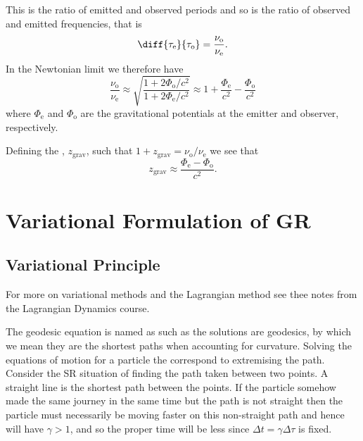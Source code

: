 \documentclass[fleqn]{NotesClass}
\begin{document}
    This is the ratio of emitted and observed periods and so is the ratio of observed and emitted frequencies, that is
    \begin{equation}
        \diff{\tau_{\mathrm{e}}}{\tau_{\mathrm{o}}} = \frac{\nu_{\mathrm{o}}}{\nu_{\mathrm{e}}}.
    \end{equation}
    In the Newtonian limit we therefore have
    \begin{equation}
        \frac{\nu_{\mathrm{o}}}{\nu_{\mathrm{e}}} \approx \sqrt{\frac{1 + 2\Phi_{\mathrm{o}}/c^2}{1 + 2\Phi_{\mathrm{e}}/c^2}} \approx 1 + \frac{\Phi_{\mathrm{e}}}{c^2} - \frac{\Phi_{\mathrm{o}}}{c^2}
    \end{equation}
    where \(\Phi_{\mathrm{e}}\) and \(\Phi_{\mathrm{o}}\) are the gravitational potentials at the emitter and observer, respectively.
    
    Defining the , \(z_{\mathrm{grav}}\), such that \(1 + z_{\mathrm{grav}} = \nu_{\mathrm{o}}/\nu_{\mathrm{e}}\) we see that
    \begin{equation}
        z_{\mathrm{grav}} \approx \frac{\Phi_{\mathrm{e}} - \Phi_{\mathrm{o}}}{c^2}.
    \end{equation}
    
    \chapter{Variational Formulation of GR}
    \section{Variational Principle}
    \begin{rmk}
        For more on variational methods and the Lagrangian method see thee notes from the Lagrangian Dynamics course.
    \end{rmk}
    The geodesic equation is named as such as the solutions are geodesics, by which we mean they are the shortest paths when accounting for curvature.
    Solving the equations of motion for a particle the correspond to extremising the path.
    Consider the SR situation of finding the path taken between two points.
    A straight line is the shortest path between the points.
    If the particle somehow made the same journey in the same time but the path is not straight then the particle must necessarily be moving faster on this non-straight path and hence will have \(\gamma > 1\), and so the proper time will be less since \(\Delta t = \gamma \Delta \tau\) is fixed.
    
\end{document}
